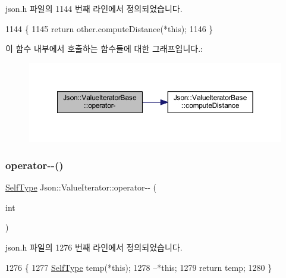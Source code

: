 json.\+h 파일의 1144 번째 라인에서 정의되었습니다.


\begin{DoxyCode}
1144                                                          \{
1145     \textcolor{keywordflow}{return} other.computeDistance(*\textcolor{keyword}{this});
1146   \}
\end{DoxyCode}
이 함수 내부에서 호출하는 함수들에 대한 그래프입니다.\+:
\nopagebreak
\begin{figure}[H]
\begin{center}
\leavevmode
\includegraphics[width=350pt]{class_json_1_1_value_iterator_base_a98e254263fca5f1fc8fcac7bcb0260bf_cgraph}
\end{center}
\end{figure}
\mbox{\label{class_json_1_1_value_iterator_a06d6a29d96caf6af324a53973159e12b}} 
\subsubsection{\texorpdfstring{operator-\/-\/()}{operator--()}\hspace{0.1cm}{\footnotesize\ttfamily [1/2]}}
{\footnotesize\ttfamily \hyperlink{class_json_1_1_value_iterator_base_a9d2a940d03ea06d20d972f41a89149ee}{Self\+Type} Json\+::\+Value\+Iterator\+::operator-\/-\/ (\begin{DoxyParamCaption}\item[{int}]{ }\end{DoxyParamCaption})\hspace{0.3cm}{\ttfamily [inline]}}



json.\+h 파일의 1276 번째 라인에서 정의되었습니다.


\begin{DoxyCode}
1276                            \{
1277     \hyperlink{class_json_1_1_value_iterator_a23357670fdad61792670d86f62db7e16}{SelfType} temp(*\textcolor{keyword}{this});
1278     --*\textcolor{keyword}{this};
1279     \textcolor{keywordflow}{return} temp;
1280   \}
\end{DoxyCode}
\mbox{\label{class_json_1_1_value_iterator_a811302a868518a0995a9def955df5720}} 
